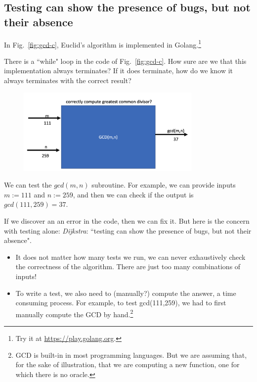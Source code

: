 \documentclass[runningheads,12pt]{article}
\begin{document}

\subsection{Testing can show the presence of bugs, but not their absence}

In Fig.~\ref{fig:gcd-c}, Euclid's algorithm is implemented in Golang.\footnote{%
Try it at \url{https://play.golang.org}.}

There is a ``while" loop in the code of Fig.~\ref{fig:gcd-c}. How sure are we that this implementation always terminates? If it does terminate, how do we know it always terminates with the correct result?

\begin{figure}[hbt]
  \includegraphics[width=0.8\textwidth]{images/gcd.png}
\end{figure}


We can test the $gcd(m,n)$ subroutine. For example, we can provide inputs $m := 111$ and $n := 259$, and then we can check if the output is $gcd(111,259) = 37$. 

If we discover an an error in the code, then we can fix it. But here is the concern with testing alone: \textit{Dijkstra}: ``testing can show the presence of bugs, but not their absence". 

\begin{itemize}
  \item It does not matter how many tests we run, we can never exhaustively check the correctness of the algorithm. There are just too many combinations of inputs!
  \item To write a test, we also need to (manually?) compute the answer, a time consuming process. For example, to test gcd(111,259), we had to first manually compute the GCD by hand.\footnote{GCD is built-in in most programming languages. But we are assuming that, for the sake of illustration, that we are computing a new function, one for which there is no oracle.}
\end{itemize}
\end{document}
